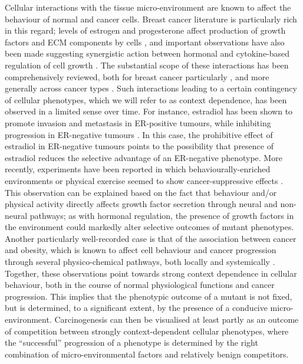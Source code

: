 \documentclass[12pt, letterpaper, onecolumn]{article}
\begin{document}
	
	Cellular interactions with the tissue micro-environment are known to affect the behaviour of normal and cancer cells. Breast cancer literature is particularly rich in this regard; levels of estrogen and progesterone affect production of growth factors and ECM components by cells \cite{Haslam2001,Woodward2000,DICKSON1987}, and important observations have also been made suggesting synergistic action between hormonal and cytokine-based regulation of cell growth \cite{Freund2003}. The substantial scope of these interactions has been comprehensively reviewed, both for breast cancer particularly \cite{Hansen2000}, and more generally across cancer types \cite{Pietras2010,Hanahan2012,Cabarcas2011a}. Such interactions leading to a certain contingency of cellular phenotypes, which we will refer to as context dependence, has been observed in a limited sense over time. For instance, estradiol has been shown to promote invasion and metastasis in ER-positive tumours, while inhibiting progression in ER-negative tumours \cite{Garcia1992}. In this case, the prohibitive effect of estradiol in ER-negative tumours points to the possibility that presence of estradiol reduces the selective advantage of an ER-negative phenotype. More recently, experiments have been reported in which behaviourally-enriched environments or physical exercise seemed to show cancer-suppressive effects \cite{Cao2010,Rundqvist2013}. This observation can be explained based on the fact that behaviour and/or physical activity directly affects growth factor secretion through neural and non-neural pathways; as with hormonal regulation, the presence of growth factors in the environment could markedly alter selective outcomes of mutant phenotypes. Another particularly well-recorded case is that of the association between cancer and obesity, which is known to affect cell behaviour and cancer progression through several physico-chemical pathways, both locally and systemically \cite{Yilmaz2012,Beyaz2016,Druso2018,Iyengar2016}. Together, these observations point towards strong context dependence in cellular behaviour, both in the course of normal physiological functions and cancer progression. This implies that the phenotypic outcome of a mutant is not fixed, but is determined, to a significant extent, by the presence of a conducive micro-environment. Carcinogenesis can then be visualised at least partly as an outcome of competition between strongly context-dependent cellular phenotypes, where the ``successful'' progression of a phenotype is determined by the right combination of micro-environmental factors and relatively benign competitors.
%	
\end{document}
